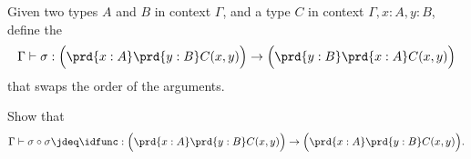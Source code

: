 \begin{exercises}
  \exercise \label{ex:swap}
  \begin{subexenum}
  \item Given two types $A$ and $B$ in context $\Gamma$, and a type $C$ in context $\Gamma,x:A,y:B$, define the 
    \begin{equation*}
      \Gamma\vdash \sigma:\Big(\prd{x:A}\prd{y:B}C(x,y)\Big)\to\Big(\prd{y:B}\prd{x:A}C(x,y)\Big)
    \end{equation*}
    that swaps the order of the arguments.
  \item Show that
    \begin{equation*}
      \Gamma\vdash \sigma\circ\sigma\jdeq\idfunc:\Big(\prd{x:A}\prd{y:B}C(x,y)\Big)\to \Big(\prd{x:A}\prd{y:B}C(x,y)\Big).
    \end{equation*}
  \end{subexenum}
\end{exercises}
